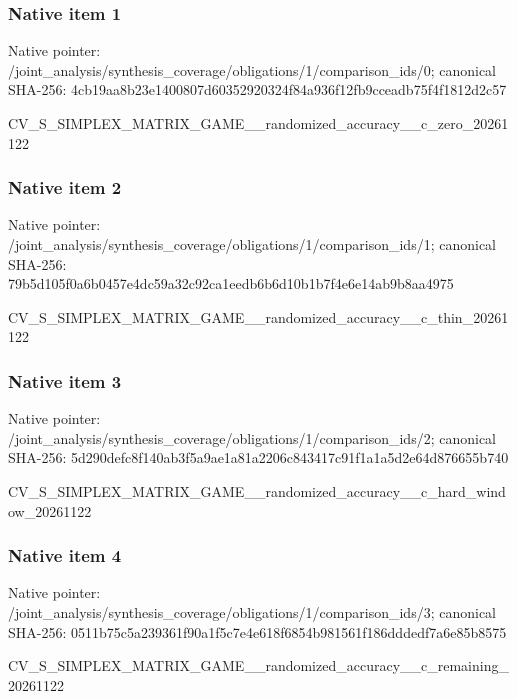 \documentclass[10pt,a4paper]{article}
\begin{document}
\subsubsection{Native item 1}


Native pointer: /joint\_analysis/synthesi\allowbreak{}s\_coverage/obligations/1\allowbreak{}/comparison\_ids/0; canonical SHA-256: 4cb19aa8b23e1400807d6035\allowbreak{}2920324f84a936f12fb9ccea\allowbreak{}db75f4f1812d2c57


CV\_S\_SIMPLEX\_MATRIX\_GAME\allowbreak{}\_\_randomized\_accuracy\_\_c\allowbreak{}\_zero\_20261122


\subsubsection{Native item 2}


Native pointer: /joint\_analysis/synthesi\allowbreak{}s\_coverage/obligations/1\allowbreak{}/comparison\_ids/1; canonical SHA-256: 79b5d105f0a6b0457e4dc59a\allowbreak{}32c92ca1eedb6b6d10b1b7f4\allowbreak{}e6e14ab9b8aa4975


CV\_S\_SIMPLEX\_MATRIX\_GAME\allowbreak{}\_\_randomized\_accuracy\_\_c\allowbreak{}\_thin\_20261122


\subsubsection{Native item 3}


Native pointer: /joint\_analysis/synthesi\allowbreak{}s\_coverage/obligations/1\allowbreak{}/comparison\_ids/2; canonical SHA-256: 5d290defc8f140ab3f5a9ae1\allowbreak{}a81a2206c843417c91f1a1a5\allowbreak{}d2e64d876655b740


CV\_S\_SIMPLEX\_MATRIX\_GAME\allowbreak{}\_\_randomized\_accuracy\_\_c\allowbreak{}\_hard\_window\_20261122


\subsubsection{Native item 4}


Native pointer: /joint\_analysis/synthesi\allowbreak{}s\_coverage/obligations/1\allowbreak{}/comparison\_ids/3; canonical SHA-256: 0511b75c5a239361f90a1f5c\allowbreak{}7e4e618f6854b981561f186d\allowbreak{}ddedf7a6e85b8575


CV\_S\_SIMPLEX\_MATRIX\_GAME\allowbreak{}\_\_randomized\_accuracy\_\_c\allowbreak{}\_remaining\_20261122
\end{document}
